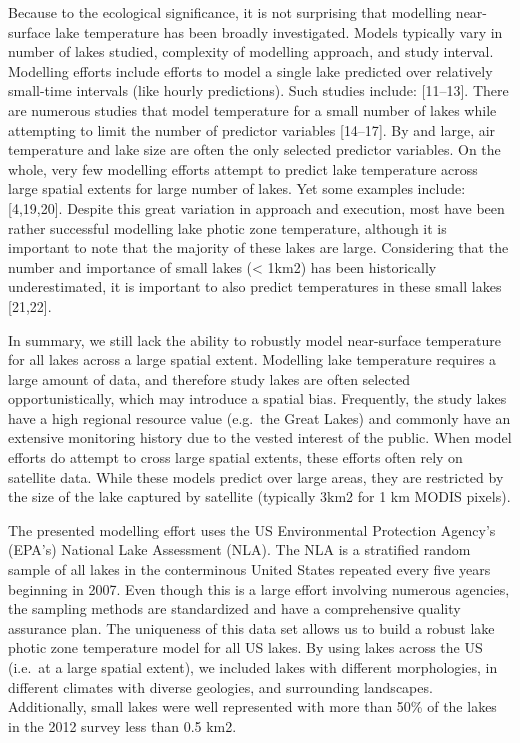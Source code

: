 \documentclass[
]{article}
\begin{document}
Because to the ecological significance, it is not surprising that
modelling near-surface lake temperature has been broadly investigated.
Models typically vary in number of lakes studied, complexity of
modelling approach, and study interval. Modelling efforts include
efforts to model a single lake predicted over relatively small-time
intervals (like hourly predictions). Such studies include: {[}11--13{]}.
There are numerous studies that model temperature for a small number of
lakes while attempting to limit the number of predictor variables
{[}14--17{]}. By and large, air temperature and lake size are often the
only selected predictor variables. On the whole, very few modelling
efforts attempt to predict lake temperature across large spatial extents
for large number of lakes. Yet some examples include: {[}4,19,20{]}.
Despite this great variation in approach and execution, most have been
rather successful modelling lake photic zone temperature, although it is
important to note that the majority of these lakes are large.
Considering that the number and importance of small lakes (\textless{}
1km2) has been historically underestimated, it is important to also
predict temperatures in these small lakes {[}21,22{]}.

In summary, we still lack the ability to robustly model near-surface
temperature for all lakes across a large spatial extent. Modelling lake
temperature requires a large amount of data, and therefore study lakes
are often selected opportunistically, which may introduce a spatial
bias. Frequently, the study lakes have a high regional resource value
(e.g.~the Great Lakes) and commonly have an extensive monitoring history
due to the vested interest of the public. When model efforts do attempt
to cross large spatial extents, these efforts often rely on satellite
data. While these models predict over large areas, they are restricted
by the size of the lake captured by satellite (typically 3km2 for 1 km
MODIS pixels).

The presented modelling effort uses the US Environmental Protection
Agency's (EPA's) National Lake Assessment (NLA). The NLA is a stratified
random sample of all lakes in the conterminous United States repeated
every five years beginning in 2007. Even though this is a large effort
involving numerous agencies, the sampling methods are standardized and
have a comprehensive quality assurance plan. The uniqueness of this data
set allows us to build a robust lake photic zone temperature model for
all US lakes. By using lakes across the US (i.e.~at a large spatial
extent), we included lakes with different morphologies, in different
climates with diverse geologies, and surrounding landscapes.
Additionally, small lakes were well represented with more than 50\% of
the lakes in the 2012 survey less than 0.5 km2.
\end{document}
